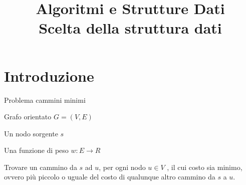 
\title[ASD - Scelta struttura dati]{\textbf{Algoritmi e Strutture Dati}\\[24pt]Scelta della struttura dati}

\renewcommand{\Primo}{\mathit{start}\xspace}
\renewcommand{\Ultimo}{\mathit{end}\xspace}

\usepackage{tikz}
\usetikzlibrary{trees}
\usetikzlibrary{matrix}
\usetikzlibrary{graphs}
\usetikzlibrary{shapes}
\usetikzlibrary{positioning}
\usepackage{xmpmulti}
\usepackage{listings}





\graphicspath{{figs/11/}}



\FrameTitle{}

\FrameContent



\section{Introduzione}

\begin{frame}{Problema cammini minimi}

\vspace{-9pt}
\begin{myboxtitle}[Input]
\BI
\item \alert{Grafo orientato} $G=(V,E)$
\item Un nodo \alert{sorgente} $s$
\item Una \alert{funzione di peso} $w: E \rightarrow R$
\EI
\end{myboxtitle}

\begin{myboxtitle}[Definizione]
\end{myboxtitle}

\begin{myboxtitle}[Output]
Trovare un cammino da $s$ ad $u$, per ogni nodo $u \in V$ , il cui costo sia minimo, ovvero più 
piccolo o uguale del costo di qualunque altro cammino da $s$ a $u$.
\end{myboxtitle}

\end{frame}

